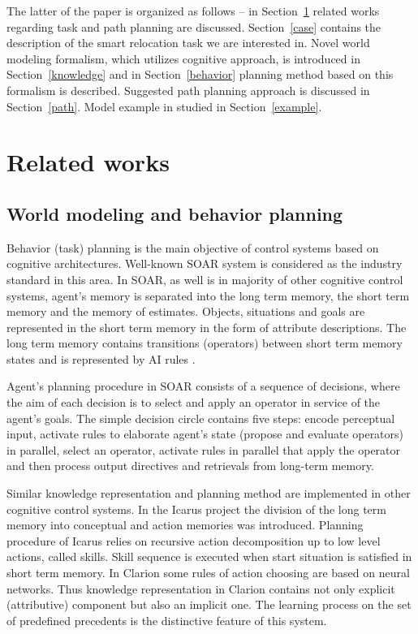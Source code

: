 \documentclass[runningheads,a4paper]{llncs}
\begin{document}
The latter of the paper is organized as follows – in Section~\ref{works} related works regarding task and path planning are discussed. Section~\ref{case} contains the description of the smart relocation task we are interested in. Novel world modeling formalism, which utilizes cognitive approach, is introduced in Section~\ref{knowledge} and in Section~\ref{behavior} planning method based on this formalism is described. Suggested path planning approach is discussed in Section~\ref{path}. Model example in studied in Section~\ref{example}.

\section{Related works}\label{works}
\subsection{World modeling and behavior planning}

Behavior (task) planning is the main objective of control systems based on cognitive architectures. Well-known SOAR \cite{Laird2008,Laird2012} system is considered as the industry standard in this area. In SOAR, as well is in majority of other cognitive control systems, agent's memory is separated into the long term memory, the short term memory and the memory of estimates. Objects, situations and goals are represented in the short term memory in the form of attribute descriptions. The long term memory contains transitions (operators) between short term memory states and is represented by AI rules \cite{Nilsson1998}.
 
Agent's planning procedure in SOAR consists of a sequence of decisions, where the aim of each decision is to select and apply an operator in service of the agent's goals. The simple decision circle contains five steps: encode perceptual input, activate rules to elaborate agent's state (propose and evaluate operators) in parallel, select an operator, activate rules in parallel that apply the operator and then process output directives and retrievals from long-term memory.

Similar knowledge representation and planning method are implemented in other cognitive control systems. In the Icarus project \cite{Langley1997,Langley2006} the division of the long term memory into conceptual and action memories was introduced. Planning procedure of Icarus relies on recursive action decomposition up to low level actions, called skills. Skill sequence is executed when start situation is satisfied in short term memory. In Clarion \cite{Sun1994,Sun2006} some rules of action choosing are based on neural networks. Thus knowledge representation in Clarion contains not only explicit (attributive) component but also an implicit one. The learning process on the set of predefined precedents is the distinctive feature of this system.
\end{document}
